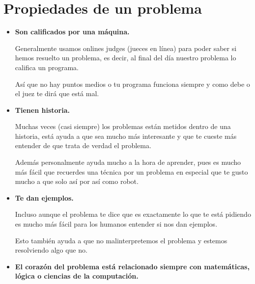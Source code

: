 \documentclass[12pt, fleqn]{report}                             %
\theoremstyle{break}                                            %
\begin{document}
        \clearpage
        \section{Propiedades de un problema}

            \begin{itemize}
                \item \textbf{Son calificados por una máquina.}

                    Generalmente usamos onlines judges (jueces en línea) para poder saber si hemos
                    resuelto un problema, es decir, al final del día nuestro problema lo califica 
                    un programa. 

                    Así que no hay puntos medios o tu programa funciona siempre y como debe o el juez
                    te dirá que está mal.

                \item \textbf{Tienen historia.}
                
                    Muchas veces (casi siempre) los problemas están metidos dentro de una historia,
                    está ayuda a que sea mucho más interesante y que te cueste más entender de que
                    trata de verdad el problema.

                    Además personalmente ayuda mucho a la hora de aprender, pues es mucho más fácil
                    que recuerdes una técnica por un problema en especial que te gusto mucho a 
                    que solo así por así como robot.

                \item \textbf{Te dan ejemplos.}
                
                    Incluso aunque el problema te dice que es exactamente lo que te está pidiendo
                    es mucho más fácil para los humanos entender si nos dan ejemplos.

                    Esto también ayuda a que no malinterpretemos el problema y estemos resolviendo
                    algo que no.

                \item \textbf{El corazón del problema está relacionado siempre con matemáticas, lógica o
                ciencias de la computación.}

            \end{itemize}
\end{document}
